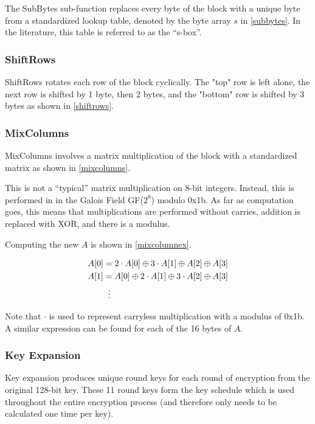 \documentclass[a4paper,10pt,conference]{IEEEtran}
\begin{document}
The SubBytes sub-function replaces every byte of the block with a unique byte from a standardized lookup table, denoted by the byte array $s$ in \ref{subbytes}.  In the literature, this table is referred to as the ``s-box''.

\subsubsection{ShiftRows}

ShiftRows rotates each row of the block cyclically.  The "top" row is left alone, the next row is shifted by 1 byte, then 2 bytes, and the "bottom" row is shifted by 3 bytes as shown in \ref{shiftrows}.

\subsubsection{MixColumns}

MixColumns involves a matrix multiplication of the block with a standardized matrix as shown in \ref{mixcolumns}.

This is not a ``typical'' matrix multiplication on 8-bit integers.  Instead, this is performed in in the Galois Field GF($2^8$) modulo 0x1b.  As far as computation goes, this means that multiplications are performed without carries, addition is replaced with XOR, and there is a modulus\cite{galois}.

Computing the new $A$ is shown in \ref{mixcolumnex}.

\begin{align}
 \label{mixcolumnex}
 A[0] &= 2 \cdot A[0] \oplus 3 \cdot A[1] \oplus A[2] \oplus A[3] \\
 A[1] &= A[0] \oplus 2 \cdot A[1] \oplus 3 \cdot A[2] \oplus A[3] \\
 &\;\;\vdots \notag
\end{align}

Note that $\cdot$ is used to represent carryless multiplication with a modulus of 0x1b.  A similar expression can be found for each of the 16 bytes of $A$.

\subsubsection{Key Expansion}

Key expansion produces unique round keys for each round of encryption from the original 128-bit key.  These 11  round keys form the key schedule which is used throughout the entire encryption process (and therefore only needs to be calculated one time per key).
\end{document}
